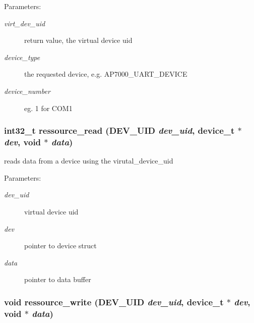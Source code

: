 \begin{Desc}
\item[Parameters:]
\begin{description}
\item[{\em virt\_\-dev\_\-uid}]return value, the virtual device uid \item[{\em device\_\-type}]the requested device, e.g. AP7000\_\-UART\_\-DEVICE \item[{\em device\_\-number}]eg. 1 for COM1 \end{description}
\end{Desc}
\hypertarget{group___r_e_s_o_u_r_c_e___m_g1a881ac8d628460d6192af633a85c78e}{
\subsubsection[{ressource\_\-read}]{\setlength{\rightskip}{0pt plus 5cm}int32\_\-t ressource\_\-read ({\bf DEV\_\-UID} {\em dev\_\-uid}, \/  device\_\-t $\ast$ {\em dev}, \/  void $\ast$ {\em data})}}
\label{group___r_e_s_o_u_r_c_e___m_g1a881ac8d628460d6192af633a85c78e}


reads data from a device using the virutal\_\-device\_\-uid 

\begin{Desc}
\item[Parameters:]
\begin{description}
\item[{\em dev\_\-uid}]virtual device uid \item[{\em dev}]pointer to device struct \item[{\em data}]pointer to data buffer \end{description}
\end{Desc}
\hypertarget{group___r_e_s_o_u_r_c_e___m_g3dcd2a4d0edfb34e53f059b90700b846}{
\subsubsection[{ressource\_\-write}]{\setlength{\rightskip}{0pt plus 5cm}void ressource\_\-write ({\bf DEV\_\-UID} {\em dev\_\-uid}, \/  device\_\-t $\ast$ {\em dev}, \/  void $\ast$ {\em data})}}
\label{group___r_e_s_o_u_r_c_e___m_g3dcd2a4d0edfb34e53f059b90700b846}



